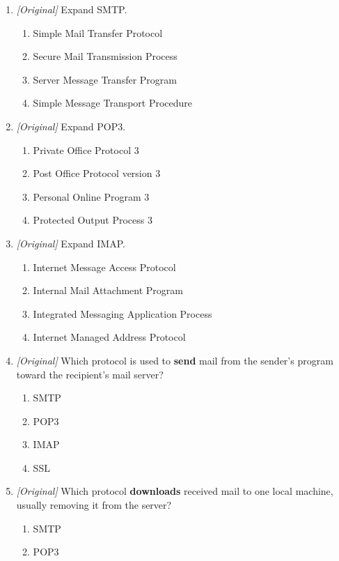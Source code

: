 \begin{enumerate}[label=\textbf{Q\arabic*.}, leftmargin=*]
\item \textit{[Original]} Expand SMTP.
  \begin{enumerate}[label=\Alph*.]
    \item Simple Mail Transfer Protocol
    \item Secure Mail Transmission Process
    \item Server Message Transfer Program
    \item Simple Message Transport Procedure
  \end{enumerate}
\item \textit{[Original]} Expand POP3.
  \begin{enumerate}[label=\Alph*.]
    \item Private Office Protocol 3
    \item Post Office Protocol version 3
    \item Personal Online Program 3
    \item Protected Output Process 3
  \end{enumerate}
\item \textit{[Original]} Expand IMAP.
  \begin{enumerate}[label=\Alph*.]
    \item Internet Message Access Protocol
    \item Internal Mail Attachment Program
    \item Integrated Messaging Application Process
    \item Internet Managed Address Protocol
  \end{enumerate}
\item \textit{[Original]} Which protocol is used to \textbf{send} mail from
  the sender's program toward the recipient's mail server?
  \begin{enumerate}[label=\Alph*.]
    \item SMTP
    \item POP3
    \item IMAP
    \item SSL
  \end{enumerate}
\item \textit{[Original]} Which protocol \textbf{downloads} received mail to
  one local machine, usually removing it from the server?
  \begin{enumerate}[label=\Alph*.]
    \item SMTP
    \item POP3

\end{enumerate}
\end{enumerate}
